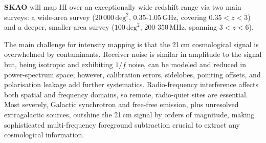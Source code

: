 \begin{observationblock}
\textbf{SKAO} will map HI over an exceptionally wide redshift range via two main surveys: a wide-area survey ($20\,000\,\text{deg}^2$, $0.35$-$1.05\,\text{GHz}$, covering $0.35 < z < 3$) and a deeper, smaller-area survey ($100\,\text{deg}^2$, $200$-$350\,\text{MHz}$, spanning $3 < z < 6$).
\end{observationblock}

The main challenge for intensity mapping is that the 21\,cm cosmological signal is overwhelmed by contaminants. Receiver noise is similar in amplitude to the signal but, being isotropic and exhibiting $1/f$ noise, can be modeled and reduced in power-spectrum space; however, calibration errors, sidelobes, pointing offsets, and polarisation leakage add further systematics. Radio-frequency interference affects both spatial and frequency domains, so remote, radio-quiet sites are essential. Most severely, Galactic synchrotron and free-free emission, plus unresolved extragalactic sources, outshine the 21\,cm signal by orders of magnitude, making sophisticated multi-frequency foreground subtraction crucial to extract any cosmological information.








